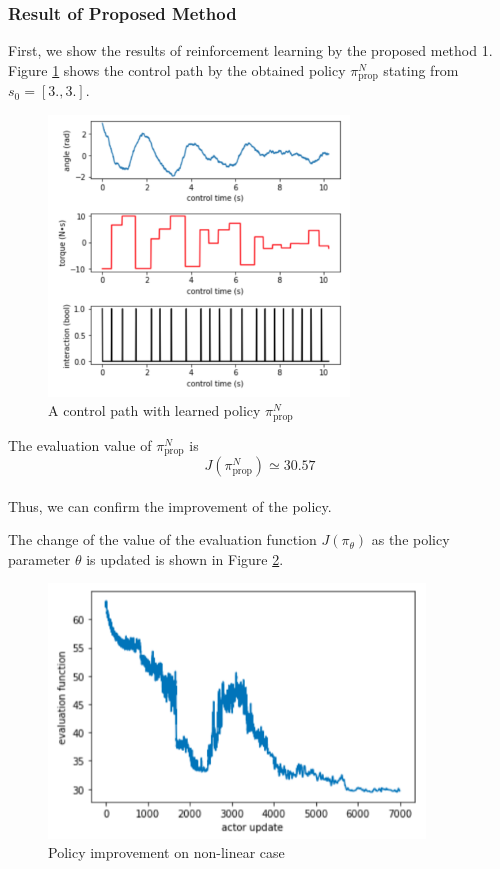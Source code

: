 \documentclass[english, dvipdfmx]{ampmt}             %
\begin{document}
\subsubsection{Result of Proposed Method}
First, we show the results of reinforcement learning by the proposed method 1. Figure \ref{proposed_1_nl} shows the control path by the obtained policy $\pi_{\textrm{prop}}^N$ stating from $s_0 = [3., 3.]$.
\begin{figure}[H]
	\centering
 	\includegraphics[width=8cm]{proposed_1_nl.png}
 	\caption{A control path with learned policy $\pi_{\textrm{prop}}^N$} \label{proposed_1_nl}
\end{figure}
The evaluation value of $\pi_{\textrm{prop}}^N$ is
\begin{equation}
	J(\pi_{\textrm{prop}}^N) \simeq 30.57
\end{equation}\\
Thus, we can confirm the improvement of the policy.\par
The change of the value of the evaluation function $J( \pi_{\theta})$ as the policy parameter $\theta$ is updated is shown in Figure \ref{evaluation_log_nl}.
\begin{figure}[H]
	\centering
 	\includegraphics[width=10cm]{evaluation_log_nl.png}
 	\caption{Policy improvement on non-linear case} \label{evaluation_log_nl}
\end{figure}
\end{document}
